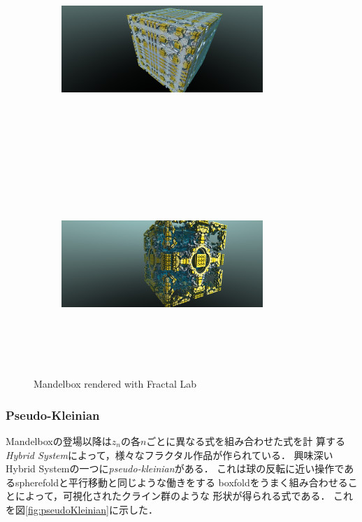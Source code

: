 \begin{figure}[h!tbp]
 \begin{subfigure}{0.49\hsize}
  \center
  \includegraphics[width=3in, height=3in, keepaspectratio]{../img/fractal/mandelbox.pdf}
  \caption{}
  \label{fig:mandelbox1}
 \end{subfigure}
 \hspace*{\fill}
 \begin{subfigure}{0.49\hsize}
  \center
  \includegraphics[width=3in, height=3in, keepaspectratio]{../img/fractal/mandelbox2.pdf}
  \caption{}
  \label{fig:mandelbox2}
 \end{subfigure}
 \caption{Mandelbox rendered with Fractal Lab}
 \label{fig:mandelbox}
\end{figure}


\subsubsection{Pseudo-Kleinian}

Mandelboxの登場以降は$z_n$の各$n$ごとに異なる式を組み合わせた式を計
算する\textit{Hybrid System}によって，様々なフラクタル作品が作られている．
興味深いHybrid Systemの一つに\textit{pseudo-kleinian}がある．
これは球の反転に近い操作であるspherefoldと平行移動と同じような働きをする
boxfoldをうまく組み合わせることによって，可視化されたクライン群のような
形状が得られる式である．
これを図\ref{fig:pseudoKleinian}に示した．

